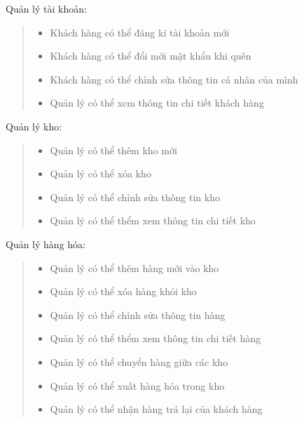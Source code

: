         Quản lý tài khoản:
        \begin{quote}
            \begin{itemize}
                \item Khách hàng có thể đăng kí tài khoản mới
                \item Khách hàng có thể đổi mới mật khẩu khi quên
                \item Khách hàng có thể chỉnh sửa thông tin cá nhân của mình
                \item Quản lý có thể xem thông tin chi tiết khách hàng
            \end{itemize}
        \end{quote}
    
        Quản lý kho:
        \begin{quote}
            \begin{itemize}
                \item Quản lý có thể thêm kho mới
                \item Quản lý có thể xóa kho
                \item Quản lý có thể chỉnh sửa thông tin kho
                \item Quản lý có thể thểm xem thông tin chi tiết kho
            \end{itemize}
        \end{quote}
        
        Quản lý hàng hóa:
        \begin{quote}
            \begin{itemize}
                \item Quản lý có thể thêm hàng mới vào kho
                \item Quản lý có thể xóa hàng khỏi kho
                \item Quản lý có thể chỉnh sửa thông tin hàng
                \item Quản lý có thể thểm xem thông tin chi tiết hàng
                \item Quản lý có thể chuyển hàng giữa các kho
                \item Quản lý có thể xuất hàng hóa trong kho
                \item Quản lý có thể nhận hàng trả lại của khách hàng
            \end{itemize}
        \end{quote}
        
